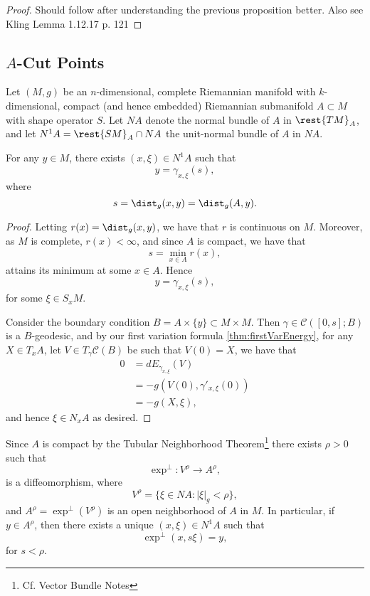 \begin{proof}
Should follow after understanding the previous proposition better.  Also see Kling Lemma 1.12.17 p. 121
\end{proof}





\subsection{$A$-Cut Points}

Let $(M,g)$ be an $n$-dimensional, complete Riemannian manifold with $k$-dimensional, compact (and hence embedded) Riemannian submanifold $A\subset M$ with shape operator $S$.  Let $NA$ denote the normal bundle of $A$ in $\rest{TM}_A$, and let $N^1A=\rest{SM}_A\cap NA$ the unit-normal bundle of $A$ in $NA$.

\begin{lem}
    For any $y\in M$, there exists $(x,\xi)\in N^1A$ such that
    $$y=\gamma_{x,\xi}(s),$$
    where
    $$s=\dist_g(x,y)=\dist_g(A,y).$$
\end{lem}

\begin{proof}
Letting $r(x)=\dist_g(x,y)$, we have that $r$ is continuous on $M$.  Moreover, as $M$ is complete, $r(x)<\infty$, and since $A$ is compact, we have that
$$s=\min_{x\in A}r(x),$$
attains its minimum at some $x\in A$.  Hence
$$y=\gamma_{x,\xi}(s),$$
for some $\xi\in S_xM$.

Consider the boundary condition $B=A\times\{y\}\subset M\times M$.  Then $\gamma\in\mathcal{C}([0,s];B)$ is a $B$-geodesic, and by our first variation formula \cref{thm:firstVarEnergy}, for any $X\in T_xA$, let $V\in T_\gamma\mathcal{C}(B)$ be such that $V(0)=X$, we have that
\begin{align*}
	0&=dE_{\gamma_{x,\xi}}(V)\\
	&=-g(V(0),\gamma'_{x,\xi}(0))\\
	&=-g(X,\xi),
\end{align*}
and hence $\xi\in N_xA$ as desired.
\end{proof}

Since $A$ is compact by the Tubular Neighborhood Theorem\footnote{Cf. Vector Bundle Notes} there exists $\rho>0$ such that
$$\exp^\perp:V^\rho\to A^\rho,$$
is a diffeomorphism, where
$$V^\rho=\{\xi\in NA:|\xi|_g<\rho\},$$
and $A^\rho=\exp^\perp(V^\rho)$ is an open neighborhood of $A$ in $M$.  In particular, if $y\in A^\rho$, then there exists a unique $(x,\xi)\in N^1A$ such that
$$\exp^\perp(x,s\xi)=y,$$
for $s<\rho$.

